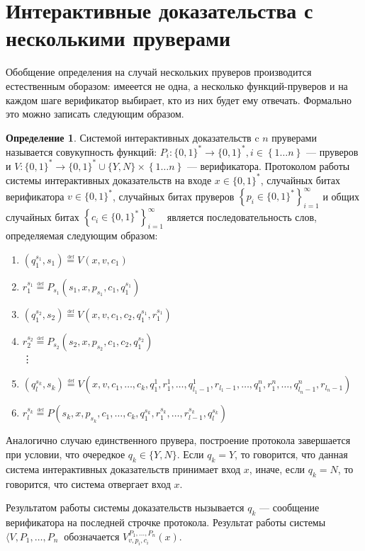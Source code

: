 \documentclass{mipt-thesis-bs}
\theoremstyle{plain}
\theoremstyle{definition}
\newtheorem{definition}{Определение}
\newcommand{\word}{\{0, 1\}^*}
\newcommand{\defeq}{\overset{\underset{\mathrm{def}}{}}{=}}
\newcommand{\set}[1]{\left\{#1\right\}}
\begin{document}
\section{Интерактивные доказательства с несколькими пруверами}
Обобщение определения на случай нескольких пруверов производится естественным оборазом: имееется не одна, а несколько функций-пруверов и на каждом шаге верификатор выбирает, кто из них будет ему отвечать. Формально это можно записать следующим образом.
\begin{definition}\label{mip_system}
Системой интерактивных доказательств c $n$ пруверами называется совукупность функций: $P_i: \word \longrightarrow \word, i \in \set{1\ldots n}$ --- пруверов и $V: \word \longrightarrow \word \cup \{Y, N\} \times \set{1 \dots n}$ --- верификатора. Протоколом работы системы интерактивных доказательств на входе $x \in \word$, случайных битах верификатора $v \in \word$, случайных битах пруверов $\left\{p_i\in \word\right\}_{i=1}^{\infty}$ и общих случайных битах $\left\{c_i\in \word\right\}_{i=1}^{\infty}$ является последовательность слов, определяемая следующим образом:
\begin{enumerate}
    \item $(q^{s_1}_1, s_1) \defeq V(x, v, c_1)$
    \item $r^{s_1}_1 \defeq P_{s_1}(s_1, x, p_{s_1}, c_1, q^{s_1}_1)$
    \item $(q^{s_2}_1, s_2) \defeq V(x, v, c_1, c_2, q^{s_1}_1, r^{s_1}_1)$
    \item $r^{s_2}_2 \defeq P_{s_2}(s_2, x, p_{s_2}, c_1, c_2, q^{s_2}_1)$\\
    \vdots
    \item $(q^{s_k}_l, s_k) \defeq V(x, v, c_1, \ldots, c_k, q^1_1, r^1_1, \ldots, q^1_{l_1-1}, r_{l_1-1}, \ldots, q^n_1, r^n_1, \ldots, q^n_{l_n-1}, r_{l_n-1})$
    \item $r^{s_k}_l \defeq P(s_k, x, p_{s_k}, c_1, \ldots, c_k, q^{s_k}_1, r^{s_k}_1, \ldots, r^{s_k}_{l-1}, q^{s_k}_l)$
\end{enumerate}
Аналогично случаю единственного прувера, построение протокола завершается при условии, что очередкое $q_k \in \{Y, N\}$. Если $q_k = Y$, то говорится, что данная система интерактивных доказательств принимает вход $x$, иначе, если $q_k = N$, то говорится, что система отвергает вход $x$.

Результатом работы системы доказательств нызывается $q_k$ --- сообщение верификатора на последней строчке протокола. Результат работы системы $\langle V, P_1, \ldots, P_n\>$ обозначается $V^{P_1, \ldots, P_n}_{v, p_i, c_i}(x)$.
\end{definition}
\end{document}
